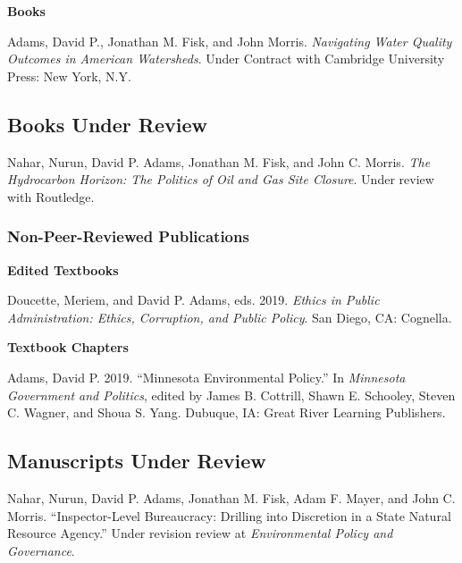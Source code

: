 \documentclass[12pt,letterpaper]{article}
\renewenvironment{itemize}{
  \begin{list}{}{
    \setlength{\leftmargin}{1.5em}
    \setlength{\itemsep}{0.25em}
    \setlength{\parskip}{0pt}
    \setlength{\parsep}{0.25em}
  }
}{
  \end{list}
}
\begin{document}
\textbf{Books}
\begin{itemize}\leftmargin=2pt\itemindent=-15pt
    \item Adams, David P., Jonathan M. Fisk, and John Morris. \emph{Navigating Water Quality Outcomes in American Watersheds}. Under Contract with Cambridge University Press: New York, N.Y.
\end{itemize}

\subsection*{Books Under Review}

\begin{itemize}\leftmargin=2pt\itemindent=-15pt
  \item Nahar, Nurun, David P. Adams, Jonathan M. Fisk, and John C. Morris. \emph{The Hydrocarbon Horizon: The Politics of Oil and Gas Site Closure}. Under review with Routledge.
\end{itemize}

\subsubsection*{Non-Peer-Reviewed Publications}

\textbf{Edited Textbooks}
\begin{itemize}\leftmargin=2pt\itemindent=-15pt
    \item Doucette, Meriem, and David P. Adams, eds. 2019. \emph{Ethics in Public Administration: Ethics, Corruption, and Public Policy}. San Diego, CA: Cognella.
\end{itemize}

\textbf{Textbook Chapters}
\begin{itemize}\leftmargin=2pt\itemindent=-15pt
    \item Adams, David P. 2019. ``Minnesota Environmental Policy.'' In \emph{Minnesota Government and Politics}, edited by James B. Cottrill, Shawn E. Schooley, Steven C. Wagner, and Shoua S. Yang. Dubuque, IA: Great River Learning Publishers.
\end{itemize}

\subsection*{Manuscripts Under Review}
\begin{itemize}\leftmargin=2pt\itemindent=-15pt\leftmargin=2pt\itemindent=-15pt
  
    \item Nahar, Nurun, David P. Adams, Jonathan M. Fisk, Adam F. Mayer, and John C. Morris. ``Inspector-Level Bureaucracy: Drilling into Discretion in a State Natural Resource Agency.'' Under revision review at \emph{Environmental Policy and Governance}.

\end{itemize}
\end{document}
